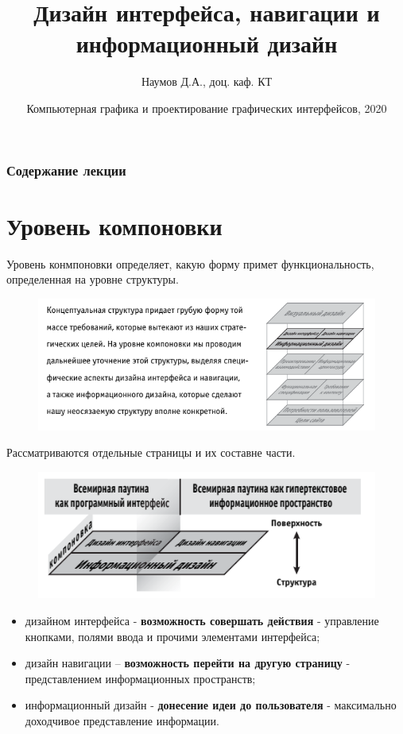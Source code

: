 \documentclass{beamer}
\title[UX Elements]{Дизайн интерфейса, навигации и информационный дизайн}
\author{Наумов Д.А., доц. каф. КТ}
\date[07.10.2020] {Компьютерная графика и проектирование графических интерфейсов, 2020}
\begin{document}
\begin{frame}
  \titlepage
\end{frame}
  
\begin{frame}
  \frametitle{Содержание лекции}
  \tableofcontents  
\end{frame}

\section{Уровень компоновки}
  
\begin{frame}[t]
\begin{block}{Уровень конмпоновки}
определяет, какую форму примет функциональность, определенная на уровне структуры.
\end{block}
\begin{figure}[h]
\centering
\includegraphics[scale=0.6]{images/lec04-pic01.png}
\end{figure}
Рассматриваются отдельные страницы и их составне части.
\end{frame} 

\begin{frame}[t]
\begin{figure}[h]
\centering
\includegraphics[scale=0.6]{images/lec04-pic02.png}
\end{figure}
\begin{itemize}
\item  дизайном интерфейса - \textbf{возможность совершать действия} - управление кнопками, полями ввода и прочими элементами интерфейса; 
\item  дизайн навигации – \textbf{возможность перейти на другую страницу} - представлением информационных пространств;
\item  информационный дизайн - \textbf{донесение идеи до пользователя} - максимально доходчивое представление информации.
\end{itemize}
\end{frame} 
\end{document}
